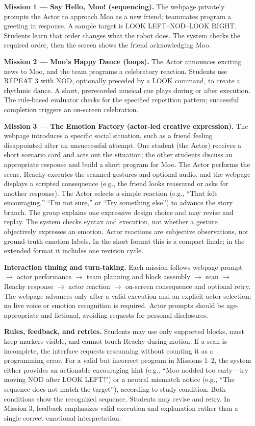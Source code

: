 \documentclass[conference,12pt,letterpaper]{IEEEtran}
\begin{document}
\textbf{Mission 1 --- Say Hello, Moo! (sequencing).} The webpage privately prompts the Actor to approach Moo as a new friend; teammates program a greeting in response. A sample target is LOOK LEFT--NOD--LOOK RIGHT. Students learn that order changes what the robot does. The system checks the required order, then the screen shows the friend acknowledging Moo.

\textbf{Mission 2 --- Moo's Happy Dance (loops).} The Actor announces exciting news to Moo, and the team programs a celebratory reaction. Students use REPEAT 3 with NOD, optionally preceded by a LOOK command, to create a rhythmic dance. A short, prerecorded musical cue plays during or after execution. The rule-based evaluator checks for the specified repetition pattern; successful completion triggers an on-screen celebration.

\textbf{Mission 3 --- The Emotion Factory (actor-led creative expression).} The webpage introduces a specific social situation, such as a friend feeling disappointed after an unsuccessful attempt. One student (the Actor) receives a short scenario card and acts out the situation; the other students discuss an appropriate response and build a short program for Moo. The Actor performs the scene, Reachy executes the scanned gestures and optional audio, and the webpage displays a scripted consequence (e.g., the friend looks reassured or asks for another response). The Actor selects a simple reaction (e.g., ``That felt encouraging,'' ``I'm not sure,'' or ``Try something else'') to advance the story branch. The group explains one expressive design choice and may revise and replay. The system checks syntax and execution, not whether a gesture objectively expresses an emotion. Actor reactions are subjective observations, not ground-truth emotion labels. In the short format this is a compact finale; in the extended format it includes one revision cycle.

\textbf{Interaction timing and turn-taking.} Each mission follows webpage prompt $\rightarrow$ actor performance $\rightarrow$ team planning and block assembly $\rightarrow$ scan $\rightarrow$ Reachy response $\rightarrow$ actor reaction $\rightarrow$ on-screen consequence and optional retry. The webpage advances only after a valid execution and an explicit actor selection; no live voice or emotion recognition is required. Actor prompts should be age-appropriate and fictional, avoiding requests for personal disclosures.

\textbf{Rules, feedback, and retries.} Students may use only supported blocks, must keep markers visible, and cannot touch Reachy during motion. If a scan is incomplete, the interface requests rescanning without counting it as a programming error. For a valid but incorrect program in Missions 1--2, the system either provides an actionable encouraging hint (e.g., ``Moo nodded too early---try moving NOD after LOOK LEFT!'') or a neutral mismatch notice (e.g., ``The sequence does not match the target''), according to study condition. Both conditions show the recognized sequence. Students may revise and retry. In Mission 3, feedback emphasizes valid execution and explanation rather than a single correct emotional interpretation.
\end{document}
